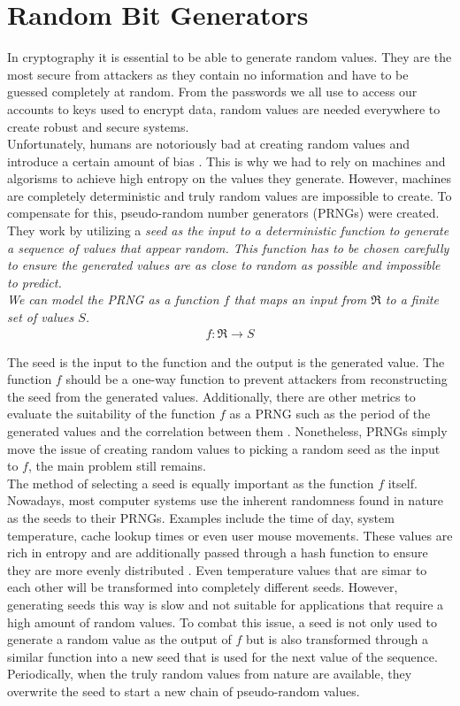 \section{Random Bit Generators}

In cryptography it is essential to be able to generate random values. They are the most secure from attackers as they contain no information and have to be guessed completely at random. From the passwords we all use to access our accounts to keys used to encrypt data, random values are needed everywhere to create robust and secure systems.
\\

Unfortunately, humans are notoriously bad at creating random values and introduce a certain amount of bias \cite{human-randomness}. This is why we had to rely on machines and algorisms to achieve high entropy on the values they generate. However, machines are completely deterministic and truly random values are impossible to create. To compensate for this, pseudo-random number generators (PRNGs) were created. They work by utilizing a \it{seed} as the input to a deterministic function to generate a sequence of values that appear random. This function has to be chosen carefully to ensure the generated values are as close to random as possible and impossible to predict.
\\

We can model the PRNG as a function $f$ that maps an input from $\Re$ to a finite set of values $S$. \cite{prng}
\begin{align}
    f: \Re \rightarrow S
\end{align}

The seed is the input to the function and the output is the generated value. The function $f$ should be a one-way function \cite{one-way-function} to prevent attackers from reconstructing the seed from the generated values. Additionally, there are other metrics to evaluate the suitability of the function $f$ as a PRNG such as the period of the generated values and the correlation between them \cite{prng}. Nonetheless, PRNGs simply move the issue of creating random values to picking a random seed as the input to $f$, the main problem still remains.
\\

The method of selecting a seed is equally important as the function $f$ itself. Nowadays, most computer systems use the inherent randomness found in nature as the seeds to their PRNGs. Examples include the time of day, system temperature, cache lookup times or even user mouse movements. These values are rich in entropy and are additionally passed through a hash function to ensure they are more evenly distributed \cite{prng}. Even temperature values that are simar to each other will be transformed into completely different seeds. However, generating seeds this way is slow and not suitable for applications that require a high amount of random values. To combat this issue, a seed is not only used to generate a random value as the output of $f$ but is also transformed through a similar function into a new seed that is used for the next value of the sequence. Periodically, when the truly random values from nature are available, they overwrite the seed to start a new chain of pseudo-random values.


